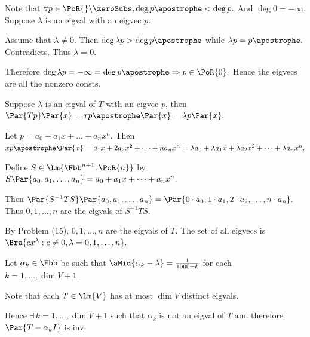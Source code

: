 \par\quad
Note that $\forall p\in\PoR{}\backslash\zeroSubs,\deg p\apostrophe<\deg p.$ And $\deg 0=-\infty.$ Suppose $\lambda$ is an eigval with an eigvec $p.$\par\quad
Assume that $\lambda\neq 0.$ Then $\deg\lambda p>\deg p\apostrophe$ while $\lambda p=p\apostrophe.$ Contradicts. Thus $\lambda=0.$\par\quad
Therefore $\deg \lambda p=-\infty=\deg p\apostrophe\Rightarrow p\in\PoR{0}.$ Hence the eigvecs are all the nonzero consts.\PfEnd
\SepLine

\par\quad
Suppose $\lambda$ is an eigval of $T$ with an eigvec $p$, then $\Par{Tp}\Par{x}=xp\apostrophe\Par{x}=\lambda p\Par{x}.$\par\quad
Let $p=a_0+a_1 x+\dots+a_n x^n.$ Then $xp\apostrophe\Par{x}=a_1 x+2a_2 x^2+\dots+n a_n x^n=\lambda a_0+\lambda a_1 x+\lambda a_2 x^2+\dots+\lambda a_n x^n.$\par\quad
Define $S\in\Lm{\Fbb^{n+1},\PoR{n}}$ by $S\Par{a_0,a_1,\dots,a_n}=a_0+a_1x+\dots+a_nx^n.$\par\quad
Then $\Par{S^{-1}TS}\Par{a_0,a_1,\dots,a_n}=\Par{0\cdot a_0,1\cdot a_1,2\cdot a_2,\dots,n\cdot a_n}.$ Thus $0,1,\dots,n$ are the eigvals of $S^{-1}TS.$\par\quad
By Problem (15), $0,1,\dots,n$ are the eigvals of $T$. The set of all eigvecs is $\Bra{cx^\lambda:c\neq 0,\lambda=0,1,\dots,n}.$\PfEnd
\SepLine

\par\quad
Let $\alpha_k\in\Fbb$ be such that $\aMid{\alpha_k-\lambda}=\frac{1}{1000+k}$ for each $k=1,\dots,\dim V+1.$\par\vspace{2pt}\quad
Note that each $T\in\Lm{V}$ has at most $\dim V$ distinct eigvals.\par\quad
Hence $\exists\,k=1,\dots,\dim V+1$ such that $\alpha_k$ is not an eigval of $T$ and therefore $\Par{T-\alpha_k I}$ is inv.\PfEnd
\SepLine[0pt][\Blind{\BulletPointX} ]

